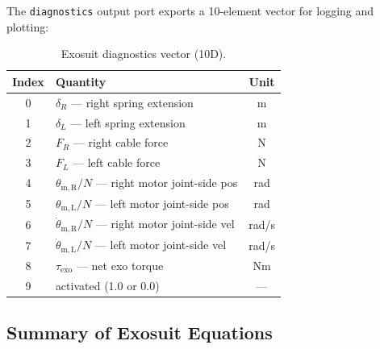 \documentclass[11pt,a4paper]{article}
\begin{document}
The \texttt{diagnostics} output port exports a 10-element vector for logging
and plotting:

\begin{table}[H]
\centering
\caption{Exosuit diagnostics vector (10D).}
\begin{tabular}{clc}
\toprule
\textbf{Index} & \textbf{Quantity} & \textbf{Unit} \\
\midrule
0 & $\delta_R$ --- right spring extension  & m \\
1 & $\delta_L$ --- left spring extension   & m \\
2 & $F_R$ --- right cable force            & N \\
3 & $F_L$ --- left cable force             & N \\
4 & $\theta_{\mathrm{m,R}}/N$ --- right motor joint-side pos  & rad \\
5 & $\theta_{\mathrm{m,L}}/N$ --- left motor joint-side pos   & rad \\
6 & $\dot{\theta}_{\mathrm{m,R}}/N$ --- right motor joint-side vel  & rad/s \\
7 & $\dot{\theta}_{\mathrm{m,L}}/N$ --- left motor joint-side vel   & rad/s \\
8 & $\tau_{\mathrm{exo}}$ --- net exo torque  & Nm \\
9 & activated (1.0 or 0.0) & --- \\
\bottomrule
\end{tabular}
\end{table}


\subsection{Summary of Exosuit Equations}
\end{document}
